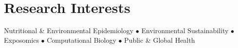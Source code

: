 \section{Research Interests}

\center
Nutritional \& Environmental Epidemiology $\bullet$ Environmental Sustainability $\bullet$ Exposomics $\bullet$ Computational Biology $\bullet$ Public \& Global Health
